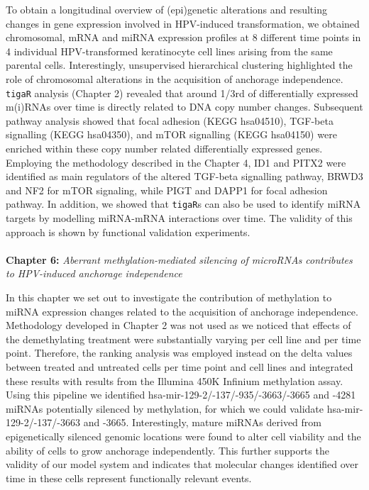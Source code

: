 To obtain a longitudinal overview of (epi)genetic alterations and resulting changes in gene expression involved in HPV-induced transformation, we obtained chromosomal, mRNA and miRNA expression profiles  at 8 different time points in 4 individual HPV-transformed keratinocyte cell lines arising from the same parental cells. Interestingly, unsupervised hierarchical clustering highlighted the role of chromosomal alterations in the acquisition of anchorage independence. 
{\tt tigaR} analysis (Chapter 2) revealed that around 1/3rd of differentially expressed m(i)RNAs over time is directly related to DNA copy number changes. Subsequent pathway analysis showed that focal adhesion (KEGG hsa04510), TGF-beta signalling (KEGG hsa04350), and mTOR signalling (KEGG hsa04150) were enriched within these copy number related differentially expressed genes. Employing the methodology described in the Chapter 4, ID1 and PITX2 were identified as main regulators of the altered TGF-beta signalling pathway, BRWD3 and NF2 for mTOR signaling, while PIGT and DAPP1 for focal adhesion pathway. In addition, we showed that {\tt tigaR}s can also be used to identify miRNA targets by modelling miRNA-mRNA interactions over time. The validity of this approach is shown by functional validation experiments.
\\
\\
\textbf{Chapter 6:} \textit{Aberrant methylation-mediated silencing of microRNAs contributes to HPV-induced anchorage independence}

 In this chapter we set out to investigate the contribution of methylation to miRNA expression changes related to the acquisition of anchorage independence. Methodology developed in Chapter 2 was not used as we noticed that effects of the demethylating treatment were substantially varying per cell line and per time point. Therefore, the ranking analysis was employed instead on the delta values between treated and untreated cells per time point and cell lines and integrated these results with results from the Illumina 450K Infinium methylation assay. Using this pipeline we identified hsa-mir-129-2/-137/-935/-3663/-3665 and -4281 miRNAs potentially silenced by methylation, for which we could validate hsa-mir-129-2/-137/-3663 and -3665. Interestingly, mature miRNAs derived from epigenetically silenced genomic locations were found to alter cell viability and the ability of cells to grow anchorage independently. This further supports the validity of our model system and indicates that molecular changes identified over time in these cells represent functionally relevant events.
